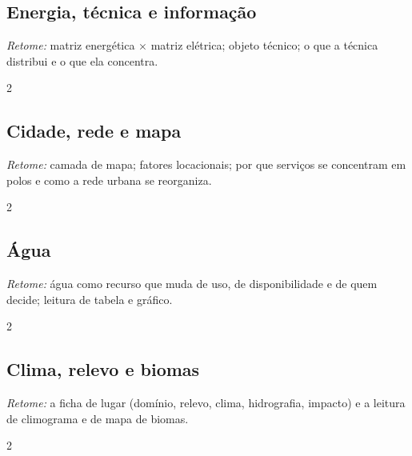 \documentclass[11pt]{article}
\begin{document}
\subsection*{Energia, técnica e informação}
\emph{Retome:} matriz energética $\times$ matriz elétrica; objeto técnico; o que a técnica distribui e o que ela concentra.
\begin{multicols}{2}\raggedcolumns

\end{multicols}

\Needspace{0.6\textheight}
\subsection*{Cidade, rede e mapa}
\emph{Retome:} camada de mapa; fatores locacionais; por que serviços se concentram em polos e como a rede urbana se reorganiza.
\begin{multicols}{2}\raggedcolumns

\end{multicols}

\Needspace{0.6\textheight}
\subsection*{Água}
\emph{Retome:} água como recurso que muda de uso, de disponibilidade e de quem decide; leitura de tabela e gráfico.
\begin{multicols}{2}\raggedcolumns

\end{multicols}

\Needspace{0.6\textheight}
\subsection*{Clima, relevo e biomas}
\emph{Retome:} a ficha de lugar (domínio, relevo, clima, hidrografia, impacto) e a leitura de climograma e de mapa de biomas.
\begin{multicols}{2}\raggedcolumns

\end{multicols}
\end{document}
